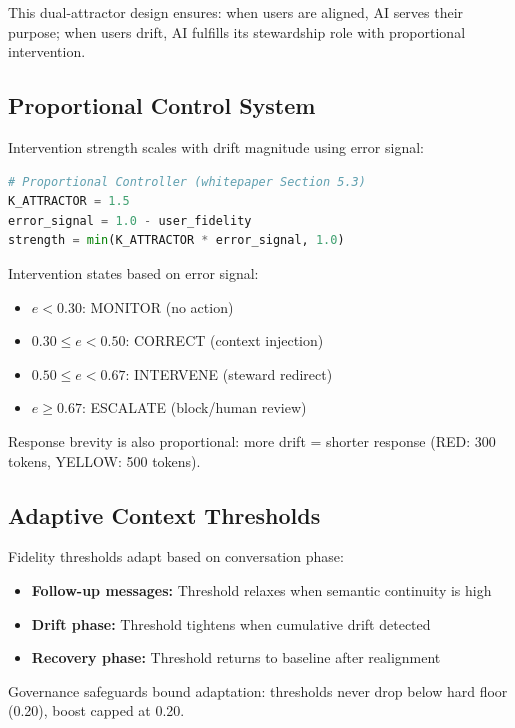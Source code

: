 \documentclass[11pt,twocolumn]{article}
\begin{document}
This dual-attractor design ensures: when users are aligned, AI serves their purpose; when users drift, AI fulfills its stewardship role with proportional intervention.

\subsection{Proportional Control System}

Intervention strength scales with drift magnitude using error signal:

\begin{lstlisting}[language=Python]
# Proportional Controller (whitepaper Section 5.3)
K_ATTRACTOR = 1.5
error_signal = 1.0 - user_fidelity
strength = min(K_ATTRACTOR * error_signal, 1.0)
\end{lstlisting}

Intervention states based on error signal:
\begin{itemize}
    \item $e < 0.30$: MONITOR (no action)
    \item $0.30 \leq e < 0.50$: CORRECT (context injection)
    \item $0.50 \leq e < 0.67$: INTERVENE (steward redirect)
    \item $e \geq 0.67$: ESCALATE (block/human review)
\end{itemize}

Response brevity is also proportional: more drift = shorter response (RED: 300 tokens, YELLOW: 500 tokens).

\subsection{Adaptive Context Thresholds}

Fidelity thresholds adapt based on conversation phase:

\begin{itemize}
    \item \textbf{Follow-up messages:} Threshold relaxes when semantic continuity is high
    \item \textbf{Drift phase:} Threshold tightens when cumulative drift detected
    \item \textbf{Recovery phase:} Threshold returns to baseline after realignment
\end{itemize}

Governance safeguards bound adaptation: thresholds never drop below hard floor (0.20), boost capped at 0.20.
\end{document}
